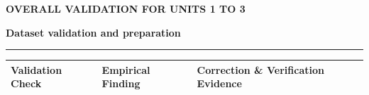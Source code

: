 \documentclass[aspectratio=169, 10pt]{beamer}
\newcommand{\slideheader}[3]{%
        \vspace{-0.25cm}%
        \noindent\begin{minipage}[t]{0.88\linewidth}%
            {\fontsize{7pt}{8.5pt}\selectfont \textbf{\color{BlueAccent}#1}}\par\vspace{1pt}%
            {\fontsize{11.5pt}{13.5pt}\selectfont \textbf{\color{NavyPrimary}#2}}%
        \end{minipage}%
        \hfill%
        \begin{minipage}[t]{0.10\linewidth}%
            \raggedleft{\fontsize{12pt}{14pt}\selectfont \textbf{\color{CoralAccent}#3}}%
        \end{minipage}\par%
        \vspace{2pt}%
        \textcolor{CardBorder}{\rule{\linewidth}{0.6pt}}\par%
        \vspace{3pt}%
    }
\begin{document}
    \begin{frame}[t]                                                                                                                                                                                   
        \slideheader{OVERALL VALIDATION FOR UNITS 1 TO 3}{Dataset validation and preparation}{06}                                                                                                      
        \vspace{-0.1cm}                                                                                                                                                                                
        \begin{table}[h]                                                                                                                                                                               
            \centering\scriptsize                                                                                                                                                                      
            \begin{tabular}{p{2.6cm}p{4.2cm}p{6.0cm}}                                                                                                                                                  
                \toprule                                                                                                                                                                               
                \rowcolor{NavyPrimary!15} \textbf{Validation Check} & \textbf{Empirical Finding} & \textbf{Correction \& Verification Evidence} \\                                                     
                \midrule                                                                                                                                                                               

\end{tabular}
\end{table}
\end{frame}
\end{document}
